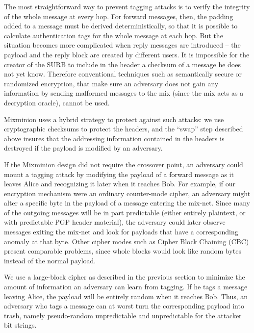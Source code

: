 \documentclass[final,inpress,inline]{ieee}
\begin{document}
The most straightforward way to prevent tagging attacks is to
verify the integrity of the whole message at every hop.  For forward messages,
then, the padding added to a message must be derived deterministically,
so that it is possible to calculate
authentication tags for the whole message at each hop.  But
the situation becomes more complicated when reply messages are
introduced -- the payload and the reply block are
created by different users. It is impossible for the creator
of the SURB to include in the header a checksum of a message he
does not yet know. Therefore conventional techniques 
such as semantically secure or randomized encryption, that
make sure an adversary does not gain any information by sending
malformed messages to the mix (since the mix acts as a decryption oracle),
cannot be used.

Mixminion uses a hybrid strategy to protect against such attacks: we use
cryptographic checksums to protect the headers, and the ``swap'' step
described above insures that the addressing information contained in the
headers is destroyed if the payload is modified by an adversary.

If the Mixminion design did not require
the crossover point, an adversary could mount a tagging
attack by modifying the payload of a forward message as
it leaves Alice and recognizing it later when it reaches Bob.
For example, if our encryption mechanism were an ordinary
counter-mode cipher, an adversary might alter a specific byte in the payload of
a message entering the mix-net. Since many of the outgoing messages
will be in part predictable (either entirely plaintext, or with
predictable PGP header material), the adversary could later observe
messages exiting the mix-net and look for payloads that have a
corresponding anomaly at that byte. Other cipher modes such as
Cipher Block Chaining (CBC) present comparable problems, since whole
blocks would look like random bytes instead of the normal payload.

We use a large-block cipher as described in the previous section to
minimize the amount of information an adversary can learn from tagging.
If he tags a message
leaving Alice, the payload will be entirely random when it reaches
Bob.  Thus, an adversary who tags a message can at worst turn the
corresponding payload into trash, namely pseudo-random unpredictable
and unpredictable for the attacker bit strings.

\end{document}

